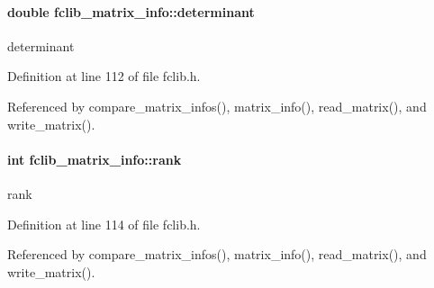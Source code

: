 \paragraph[{determinant}]{\setlength{\rightskip}{0pt plus 5cm}double fclib\+\_\+matrix\+\_\+info\+::determinant}\label{structfclib__matrix__info_a9c6697aee458be4494b215f0f003ca48}


determinant 



Definition at line 112 of file fclib.\+h.



Referenced by compare\+\_\+matrix\+\_\+infos(), matrix\+\_\+info(), read\+\_\+matrix(), and write\+\_\+matrix().

\hypertarget{structfclib__matrix__info_af838043a1769956958c4a66e6227227d}{}
\paragraph[{rank}]{\setlength{\rightskip}{0pt plus 5cm}int fclib\+\_\+matrix\+\_\+info\+::rank}\label{structfclib__matrix__info_af838043a1769956958c4a66e6227227d}


rank 



Definition at line 114 of file fclib.\+h.



Referenced by compare\+\_\+matrix\+\_\+infos(), matrix\+\_\+info(), read\+\_\+matrix(), and write\+\_\+matrix().

